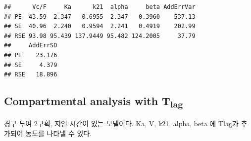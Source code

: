 \documentclass[
  11pt,
  krantz2, a4paper, twoside]{krantz}
\theoremstyle{definition}
\theoremstyle{definition}
\theoremstyle{definition}
\theoremstyle{definition}
\theoremstyle{remark}
\begin{document}
\begin{verbatim}
##      Vc/F     Ka      k21  alpha     beta AddErrVar
## PE  43.59  2.347   0.6955  2.347   0.3960    537.13
## SE  40.96  2.240   0.9594  2.241   0.4919    202.99
## RSE 93.98 95.439 137.9449 95.482 124.2005     37.79
##     AddErrSD
## PE    23.176
## SE     4.379
## RSE   18.896
\end{verbatim}

\hypertarget{compartmental-analysis-with-tlag-1}{%
\subsection{\texorpdfstring{Compartmental analysis with T\textsubscript{lag}}{Compartmental analysis with Tlag}}\label{compartmental-analysis-with-tlag-1}}

경구 투여 2구획, 지연 시간이 있는 모델이다. Ka, V, k21, alpha, beta 에 Tlag가 추가되어 농도를 나타낼 수 있다.
\end{document}
